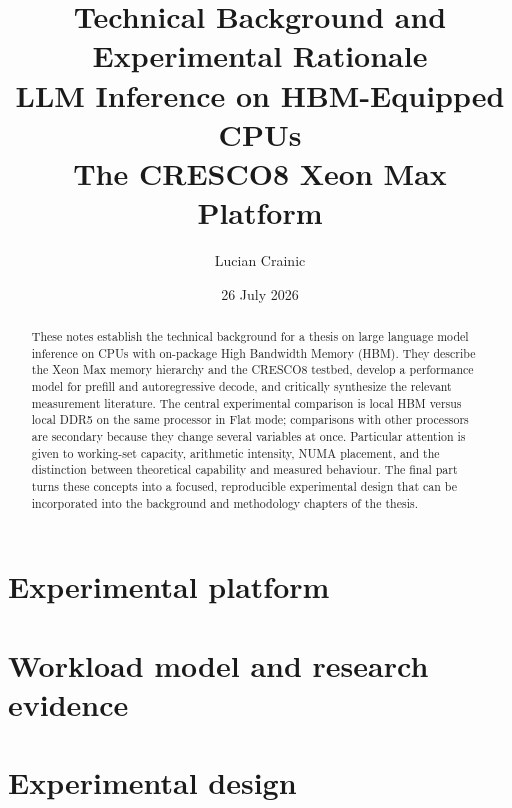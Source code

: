 \documentclass[11pt,a4paper]{article}
\title{\textbf{Technical Background and Experimental Rationale}\\[5pt]
       \Large LLM Inference on HBM-Equipped CPUs\\[3pt]
       \large The CRESCO8 Xeon Max Platform}
\author{Lucian Crainic}
\date{26 July 2026}
\begin{document}
\maketitle

\begin{abstract}
\noindent
These notes establish the technical background for a thesis on large
language model inference on CPUs with on-package High Bandwidth Memory
(HBM).  They describe the Xeon Max memory hierarchy and the CRESCO8
testbed, develop a performance model for prefill and autoregressive
decode, and critically synthesize the relevant measurement literature.
The central experimental comparison is local HBM versus local DDR5 on
the same processor in Flat mode; comparisons with other processors are
secondary because they change several variables at once.  Particular
attention is given to working-set capacity, arithmetic intensity, NUMA
placement, and the distinction between theoretical capability and
measured behaviour.  The final part turns these concepts into a focused,
reproducible experimental design that can be incorporated into the
background and methodology chapters of the thesis.
\end{abstract}

\tableofcontents

\clearpage
\part{Experimental platform}



\clearpage
\part{Workload model and research evidence}



\clearpage
\part{Experimental design}


\clearpage


\end{document}
